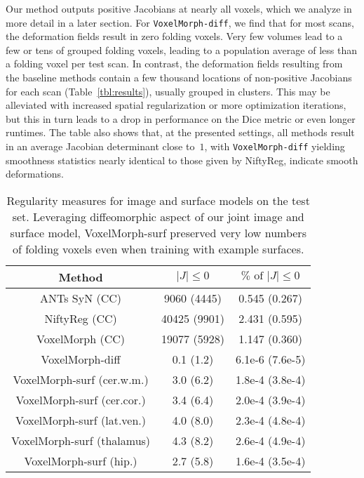 \documentclass{article}
\newcommand{\algname}{{VoxelMorph}}
\begin{document}
Our method outputs positive Jacobians at nearly all voxels, which we analyze in more detail in a later section.{\color{blue} For \verb|VoxelMorph-diff|, we find that for most scans, the deformation fields result in zero folding voxels. Very few volumes lead to a few or tens of grouped folding	voxels, leading to a population average of less than a folding voxel per test scan.} {\color{blue} In contrast, the deformation fields resulting from the baseline methods contain a few thousand locations of non-positive Jacobians for each scan (Table~\ref{tbl:results}), usually grouped in clusters. This may be alleviated with increased spatial regularization or more optimization iterations, but this in turn leads to a drop in performance on the Dice metric or even longer runtimes. The table also shows that, at the presented settings, all methods result in an average Jacobian determinant close to~$1$, with \verb|VoxelMorph-diff| yielding smoothness statistics nearly identical to those given by NiftyReg, indicate smooth deformations.}




























\begin{table}[tb!]
	\small
	\centering
	\begin{tabular}{c c c}
		\textbf{Method} & $|J| \le 0$ & $ \% \text{ of }|J| \le 0$\\
		\hline
		\hline
		\rule{0pt}{1.1em}
		ANTs SyN (CC) &9060 (4445)& 0.545 (0.267)\\
		NiftyReg (CC) &40425 (9901)& 2.431 (0.595)\\
		\algname{} (CC)&19077 (5928) & 1.147 (0.360)\\
		\hline
		\rule{0pt}{1.1em}
		\algname{}-diff                     & 0.1 (1.2) & 6.1e-6 (7.6e-5)\\
		\algname{}-surf (cer.w.m.)     & 3.0 (6.2)&  1.8e-4 (3.8e-4)\\
		\algname{}-surf (cer.cor.)   & 3.4 (6.4) & 2.0e-4 (3.9e-4)\\
		\algname{}-surf (lat.ven.)     & 4.0 (8.0) & 2.3e-4 (4.8e-4)\\
		\algname{}-surf (thalamus)          & 4.3 (8.2) & 2.6e-4 (4.9e-4)\\
		\algname{}-surf (hip.)       & 2.7 (5.8) & 1.6e-4 (3.5e-4)\\
\hline
	\end{tabular}
	\vspace{0.1cm}
	\caption{Regularity measures for image and surface models on the test set. Leveraging diffeomorphic aspect of our joint image and surface model, VoxelMorph-surf preserved very low numbers of folding voxels even when training with example surfaces.}
	\label{tbl:jacobian-results}
\end{table}
\end{document}
